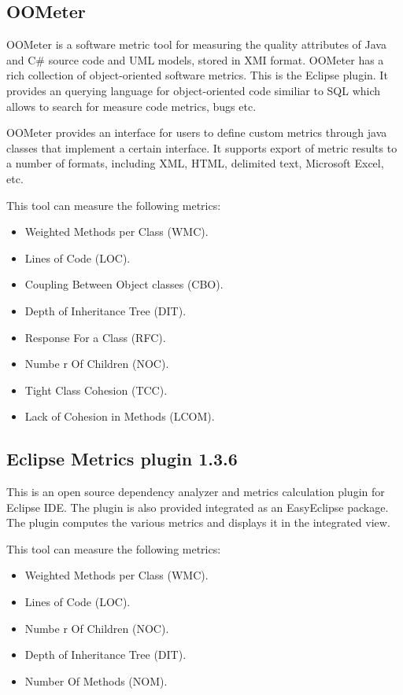 \subsection{OOMeter}

OOMeter is a software metric tool for measuring the quality attributes of Java and C\# source code and UML models, stored in XMI format. OOMeter has a rich collection of object-oriented software metrics. This is the Eclipse plugin. It provides an querying language for object-oriented code similiar to SQL which
allows to search for measure code metrics, bugs etc.

OOMeter provides an interface for users to define custom metrics through java classes that implement a certain interface. It supports export of metric results to a number of formats, including XML, HTML, delimited text, Microsoft Excel, etc.

This tool can measure the following metrics:

\begin{itemize}
	\item Weighted Methods per Class (WMC).
	\item Lines of Code (LOC). 
	\item Coupling Between Object classes (CBO).
	\item Depth of Inheritance Tree (DIT).
	\item Response For a Class (RFC).
	\item Numbe r Of Children (NOC).
	\item Tight Class Cohesion (TCC).
	\item Lack of Cohesion in Methods (LCOM).
\end{itemize}



\subsection{Eclipse Metrics plugin 1.3.6}

This is an open source dependency analyzer and metrics calculation plugin for Eclipse IDE. The plugin is also provided 
integrated  as  an  EasyEclipse  package.  The  plugin computes   the  various metrics and displays it in the integrated view.


This tool can measure the following metrics:

\begin{itemize}
	\item Weighted Methods per Class (WMC).
	\item Lines of Code (LOC). 
	\item Numbe r Of Children (NOC).
	\item Depth of Inheritance Tree (DIT).
    \item Number Of Methods (NOM).
\end{itemize}


